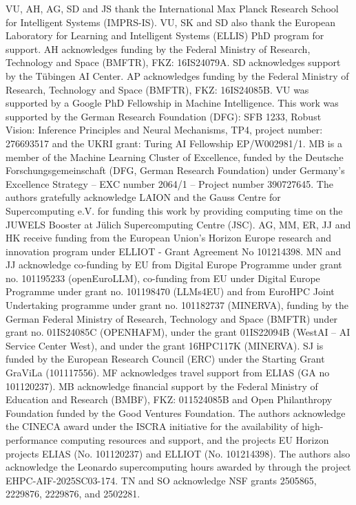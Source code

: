 \documentclass{article}
\begin{document}
VU, AH, AG, SD and JS thank the
International Max Planck Research School for Intelligent Systems (IMPRS-IS). VU, SK and SD also thank
the European Laboratory for Learning and Intelligent Systems (ELLIS) PhD program for support.
AH acknowledges funding by the Federal Ministry of Research, Technology and Space (BMFTR), FKZ: 16IS24079A.
SD acknowledges support by the Tübingen AI Center.
AP acknowledges funding by the Federal Ministry of Research, Technology and Space (BMFTR), FKZ: 16IS24085B.
VU was supported by a Google PhD Fellowship in Machine Intelligence.
This work was supported by the German Research Foundation (DFG): SFB 1233, Robust
Vision: Inference Principles and Neural Mechanisms, TP4, project number: 276693517 and the UKRI
grant: Turing AI Fellowship EP/W002981/1. MB is a member of the Machine Learning Cluster of
Excellence, funded by the Deutsche Forschungsgemeinschaft (DFG, German Research Foundation)
under Germany’s Excellence Strategy – EXC number 2064/1 – Project number 390727645.
The authors gratefully acknowledge LAION and the Gauss Centre for Supercomputing e.V. for funding this work
by providing computing time on the JUWELS Booster at Jülich Supercomputing Centre (JSC). AG, MM, ER, JJ and HK receive funding
from the European Union’s Horizon Europe research and innovation program under ELLIOT - Grant Agreement No
101214398.
MN and JJ acknowledge co-funding by EU from Digital Europe Programme under grant no. 101195233 (openEuroLLM), co-funding from EU under Digital Europe Programme under grant no. 101198470 (LLMs4EU) and from EuroHPC Joint Undertaking programme under grant no. 101182737 (MINERVA), funding by the German Federal Ministry of Research, Technology and Space (BMFTR) under grant no. 01IS24085C (OPENHAFM), under the grant 01IS22094B (WestAI -- AI Service Center West), and under the grant 16HPC117K (MINERVA).
SJ is funded by the European Research Council (ERC) under the Starting Grant GraViLa (101117556).
MF acknowledges travel support
from ELIAS (GA no 101120237). MB acknowledge financial support by the Federal Ministry of Education and
Research (BMBF), FKZ: 011524085B and Open Philanthropy Foundation funded by the Good Ventures Foundation.
The authors acknowledge the CINECA award under the ISCRA initiative for the availability of high-performance computing resources and support, and the projects EU Horizon projects ELIAS (No. 101120237) and ELLIOT (No. 101214398). The authors also acknowledge the Leonardo supercomputing hours awarded by through the project EHPC-AIF-2025SC03-174.
TN and SO acknowledge NSF grants 2505865, 2229876, 2229876, and 2502281. 
\end{document}
